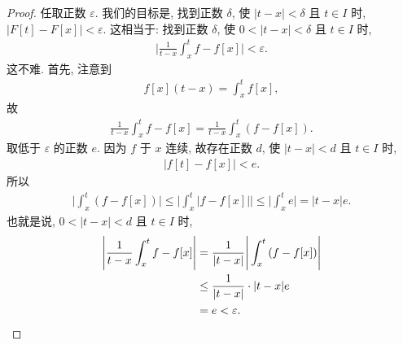 \begin{proof}
    任取正数 $\varepsilon$.
    我们的目标是, 找到正数 $\delta$,
    使 $|t - x| < \delta$ 且 $t \in I$ 时,
    $|F[t] - F[x]| < \varepsilon$.
    这相当于:
    找到正数 $\delta$,
    使 $0 < |t - x| < \delta$ 且 $t \in I$ 时,
    \begin{align*}
        \Bigg| \frac{1}{t - x} \int_{x}^{t} {f} - f[x] \Bigg| < \varepsilon.
    \end{align*}
    这不难.
    首先, 注意到
    \begin{align*}
        f[x](t - x) = \int_{x}^{t} {f[x]},
    \end{align*}
    故
    \begin{align*}
        \frac{1}{t - x} \int_{x}^{t} {f} - f[x] = \frac{1}{t - x} \int_{x}^{t} {(f - f[x])}.
    \end{align*}
    取低于 $\varepsilon$ 的正数 $e$.
    因为 $f$ 于 $x$ 连续, 故存在正数 $d$,
    使 $|t - x| < d$ 且 $t \in I$ 时,
    \begin{align*}
        |f[t] - f[x]| < e.
    \end{align*}
    所以
    \begin{align*}
        \Bigg| \int_{x}^{t} {(f - f[x])} \Bigg| \leq \Bigg| \int_{x}^{t} {|f - f[x]|} \Bigg| \leq \Bigg| \int_{x}^{t} {e} \Bigg| = |t - x|e.
    \end{align*}
    也就是说, $0 < |t - x| < d$ 且 $t \in I$ 时,
    \begin{align*}
        {\Bigg| \frac{1}{t - x} \int_{x}^{t} {f} - f[x] \Bigg|}
        = {}    & \frac{1}{|t - x|} \Bigg| \int_{x}^{t} {(f - f[x])} \Bigg| \\
        \leq {} & \frac{1}{|t - x|} \cdot |t - x|e                          \\
        = {}    & e < \varepsilon. \qedhere
    \end{align*}
\end{proof}
